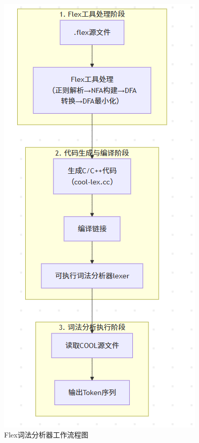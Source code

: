 \documentclass[twocolumn]{article}
\begin{document}
\begin{figure}[H]
    \centering
    \includegraphics[width=\linewidth]{Flex_work.png}
    \caption{Flex词法分析器工作流程图}
    \label{fig:flex_workflow}
\end{figure}
\end{document}

